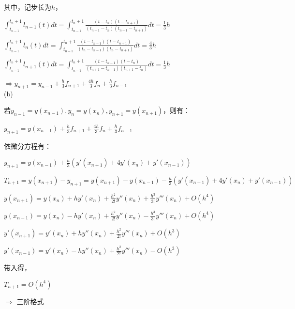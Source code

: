 \documentclass[12pt,a4paper,UTF8]{ctexart}
\begin{document}
\begin{enumerate}
其中，记步长为$h$，

$\int_{t_{n-1}}^{t_n+1} l_{n-1}(t)dt = \int_{t_{n-1}}^{t_n+1} \frac{(t-t_{n})(t-t_{n+1})}{(t_{n-1}-t_{n})(t_{n-1}-t_{n+1})}dt = \frac{1}{3}h$

$\int_{t_{n-1}}^{t_n+1} l_{n}(t)dt = \int_{t_{n-1}}^{t_n+1} \frac{(t-t_{n-1})(t-t_{n+1})}{(t_{n}-t_{n-1})(t_{n}-t_{n+1})}dt = \frac{4}{3}h$


$\int_{t_{n-1}}^{t_n+1} l_{n+1}(t)dt = \int_{t_{n-1}}^{t_n+1} \frac{(t-t_{n-1})(t-t_{n})}{(t_{n+1}-t_{n-1})(t_{n+1}-t_{n})}dt = \frac{1}{3}h$

$\Rightarrow y_{n+1} = y_{n-1} + \frac{h}{3}f_{n+1} + \frac{4h}{3}f_n + \frac{h}{3}f_{n-1}$
\\

(b)

若$y_{n-1} = y(x_{n-1}), y_n = y(x_n), y_{n+1} = y(x_{n+1})$，则有：

$y_{n+1} = y(x_{n-1}) + \frac{h}{3}f_{n+1} + \frac{4h}{3}f_n + \frac{h}{3}f_{n-1}$

依微分方程有：

$y_{n+1} = y(x_{n-1}) + \frac{h}{3} (y'(x_{n+1}) + 4y'(x_n) + y'(x_{n-1}))$

$T_{n+1} = y(x_{n+1}) - y_{n+1} = y(x_{n+1}) - y(x_{n-1}) - \frac{h}{3} (y'(x_{n+1}) + 4y'(x_n) + y'(x_{n-1}))$

$y(x_{n+1}) = y(x_{n}) + hy'(x_{n}) + \frac{h^2}{2!}y''(x_n) + \frac{h^3}{3!}y'''(x_n) + O(h^4)$

$y(x_{n-1}) = y(x_{n}) - hy'(x_{n}) + \frac{h^2}{2!}y''(x_n) - \frac{h^3}{3!}y'''(x_n) + O(h^4)$

$y'(x_{n+1}) = y'(x_{n}) + hy''(x_{n}) + \frac{h^2}{2!}y'''(x_n) + O(h^3)$

$y'(x_{n-1}) = y'(x_{n}) - hy''(x_{n}) + \frac{h^2}{2!}y'''(x_n) - O(h^3)$

带入得，

$T_{n+1} = O(h^4)$

$\Rightarrow$ 三阶格式



\end{enumerate}
\end{document}
